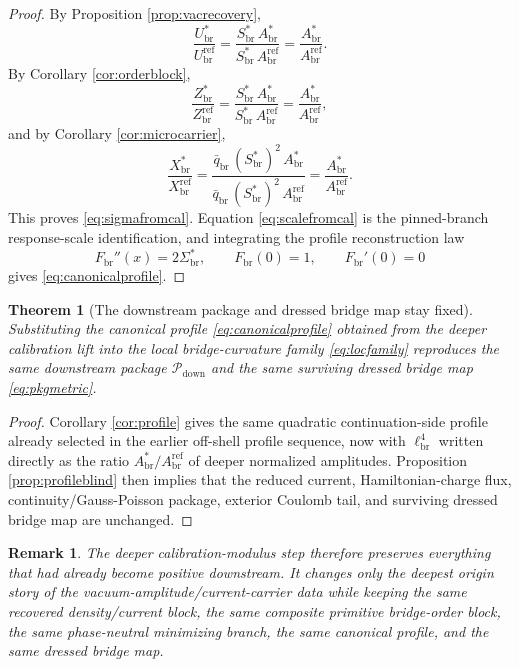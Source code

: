\documentclass[11pt]{article}
\newcommand{\CurvScale}{\ell_{\mathrm{br}}}
\newcommand{\CurvProfile}{F_{\mathrm{br}}}
\newcommand{\DownPkg}{\mathscr P_{\mathrm{down}}}
\newcommand{\RespSusEq}{\Sigma_{\mathrm{br}}^{\ast}}
\newcommand{\RespMicroEq}{X_{\mathrm{br}}^{\ast}}
\newcommand{\RespMicroRef}{X_{\mathrm{br}}^{\mathrm{ref}}}
\newcommand{\RespOrderRef}{Z_{\mathrm{br}}^{\mathrm{ref}}}
\newcommand{\RespOrderEq}{Z_{\mathrm{br}}^{\ast}}
\newcommand{\RespVacRef}{U_{\mathrm{br}}^{\mathrm{ref}}}
\newcommand{\RespVacEq}{U_{\mathrm{br}}^{\ast}}
\newcommand{\RespScaleEq}{S_{\mathrm{br}}^{\ast}}
\newcommand{\RespScaleAmpRef}{A_{\mathrm{br}}^{\mathrm{ref}}}
\newcommand{\RespScaleAmpEq}{A_{\mathrm{br}}^{\ast}}
\newcommand{\RespScaleReadout}{\bar q_{\mathrm{br}}}
\newtheorem{remark}{Remark}
\newtheorem{theorem}{Theorem}
\begin{document}
\begin{proof}
By Proposition \ref{prop:vacrecovery},
\[
\frac{\RespVacEq}{\RespVacRef}
=
\frac{\RespScaleEq\,\RespScaleAmpEq}{\RespScaleEq\,\RespScaleAmpRef}
=
\frac{\RespScaleAmpEq}{\RespScaleAmpRef}.
\]
By Corollary \ref{cor:orderblock},
\[
\frac{\RespOrderEq}{\RespOrderRef}
=
\frac{\RespScaleEq\,\RespScaleAmpEq}{\RespScaleEq\,\RespScaleAmpRef}
=
\frac{\RespScaleAmpEq}{\RespScaleAmpRef},
\]
and by Corollary \ref{cor:microcarrier},
\[
\frac{\RespMicroEq}{\RespMicroRef}
=
\frac{\RespScaleReadout\,(\RespScaleEq)^2\,\RespScaleAmpEq}
{\RespScaleReadout\,(\RespScaleEq)^2\,\RespScaleAmpRef}
=
\frac{\RespScaleAmpEq}{\RespScaleAmpRef}.
\]
This proves \eqref{eq:sigmafromcal}. Equation \eqref{eq:scalefromcal} is the pinned-branch response-scale identification, and integrating the profile reconstruction law
\[
\CurvProfile''(x)=2\RespSusEq,
\qquad
\CurvProfile(0)=1,
\qquad
\CurvProfile'(0)=0
\]
gives \eqref{eq:canonicalprofile}.
\end{proof}

\begin{theorem}[The downstream package and dressed bridge map stay fixed]
\label{thm:fixedpackage}
Substituting the canonical profile \eqref{eq:canonicalprofile} obtained from the deeper calibration lift into the local bridge-curvature family \eqref{eq:locfamily} reproduces the same downstream package \(\DownPkg\) and the same surviving dressed bridge map \eqref{eq:pkgmetric}.
\end{theorem}

\begin{proof}
Corollary \ref{cor:profile} gives the same quadratic continuation-side profile already selected in the earlier off-shell profile sequence, now with \(\CurvScale^4\) written directly as the ratio \(\RespScaleAmpEq/\RespScaleAmpRef\) of deeper normalized amplitudes. Proposition \ref{prop:profileblind} then implies that the reduced current, Hamiltonian-charge flux, continuity/Gauss-Poisson package, exterior Coulomb tail, and surviving dressed bridge map are unchanged.
\end{proof}

\begin{remark}
The deeper calibration-modulus step therefore preserves everything that had already become positive downstream. It changes only the deepest origin story of the vacuum-amplitude/current-carrier data while keeping the same recovered density/current block, the same composite primitive bridge-order block, the same phase-neutral minimizing branch, the same canonical profile, and the same dressed bridge map.
\end{remark}
\end{document}
